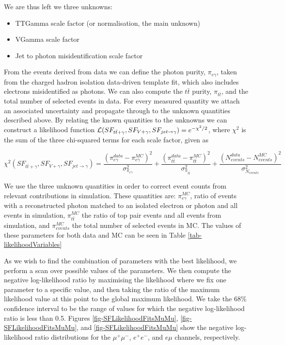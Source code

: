We are thus left we three unknowns:

\begin{itemize}
	\item TTGamma scale factor (or normalisation, the main unknown) 
	\item VGamma scale factor
	\item Jet to photon misidentification scale factor
\end{itemize}

From the events derived from data we can define the photon purity, $\pi_{e\gamma}$, taken from the charged hadron isolation data-driven template fit, which also includes electrons misidentified as photons. We can also compute the $t\bar{t}$ purity, $\pi_{t\bar{t}}$, and the total number of selected events in data. For every measured quantity we attach an associated uncertainty and propagate through to the unknown quantities described above. By relating the known quantities to the unknowns we can construct a likelihood function $\mathcal{L}(SF_{t\bar{t}+\gamma},SF_{V+\gamma},SF_{jet\to\gamma}) = e^{-\chi^2/2}$, where $\chi^2$ is the sum of the three chi-squared terms for each scale factor, given as   

\begin{equation}
\chi^2(SF_{t\bar{t}+\gamma},SF_{V+\gamma},SF_{jet\to\gamma}) = \frac{\left(\pi^{data}_{e\gamma} - \pi^{MC}_{e\gamma}\right)^2}{\sigma^2_{\pi_{e\gamma}}} + \frac{\left(\pi^{data}_{t\bar{t}} - \pi^{MC}_{t\bar{t}}\right)^2}{\sigma^2_{\pi_{t\bar{t}}}} + \frac{\left(N^{data}_{events} - N^{MC}_{events}\right)^2}{\sigma^2_{N_{events}}}
\end{equation}

We use the three unknown quantities in order to correct event counts from relevant contributions in simulation. These quantities are: $\pi_{e\gamma}^{MC}$, ratio of events with a reconstructed photon matched to an isolated electron or photon and all events in simulation, $\pi_{t\bar{t}}^{MC}$ the ratio of top pair events and all events from simulation, and $\pi_{events}^{MC}$ the total number of selected events in MC. The values of these parameters for both data and MC can be seen in Table \ref{tab-likelihoodVariables}	

As we wish to find the combination of parameters with the best likelihood, we perform a scan over possible values of the parameters. We then compute the negative log-likelihood ratio by maximising the likelihood where we fix one parameter to a specific value, and then taking the ratio of the maximum likelihood value at this point to the global maximum likelihood. We take the 68\% confidence interval to be the range of values for which the negative log-likelihood ratio is less than 0.5. Figures \ref{fig-SFLikelihoodFitsMuMu}, \ref{fig-SFLikelihoodFitsMuMu}, and \ref{fig-SFLikelihoodFitsMuMu} show the negative log-likelihood ratio distributions for the $\mu^+\mu^-$, $e^+e^-$, and $e\mu$ channels, respectively. 

